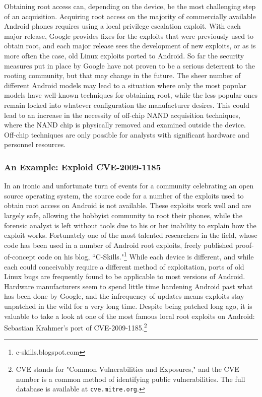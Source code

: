 Obtaining root access can, depending on the device, be the most challenging step of an acquisition.  Acquiring
root access on the majority of commercially available Android phones requires using a local privilege escalation exploit.  With each
major release, Google provides fixes for the exploits that were previously used to obtain root, and each major release sees the
development of new exploits, or as is more often the case, old Linux exploits ported to Android.  So far the security measures put
in place by Google have not proven to be a serious deterrent to the rooting community, but that may change in the future.  The sheer
number of different Android models may lead to a situation where only the most popular models have well-known techniques for
obtaining root, while the less popular ones remain locked into whatever configuration the manufacturer desires.  This could lead to
an increase in the necessity of off-chip NAND acquisition techniques, where the NAND chip is physically removed and examined outside
the device. Off-chip techniques are only possible for analysts with significant hardware and personnel resources.

\subsubsection{An Example: Exploid CVE-2009-1185}
In an ironic and unfortunate turn of events for
a community celebrating an open source operating system, the source code for a number of the exploits used to obtain root access on
Android is not available.  These exploits work well and are largely safe, allowing the hobbyist community to root their phones,
while the forensic analyst is left without tools due to his or her inability to explain how the exploit works.  Fortunately one of
the most talented researchers in the field, whose code has been used in a number of Android root exploits, freely
published proof-of-concept code on his blog,
``C-Skills."\footnote{c-skills.blogspot.com}  While each device is different, and while each could conceivably require a different
method of exploitation, ports of old Linux bugs are frequently found to be applicable to most versions of Android.  Hardware
manufacturers seem to spend little time hardening Android past what has been done by Google, and the infrequency of updates means
exploits stay unpatched in the wild for a very long time. Despite being patched long ago, it is valuable to take a
look at one of the most famous local root exploits on Android: Sebastian Krahmer's port of CVE-2009-1185.\footnote{CVE stands for
"Common Vulnerabilities and Exposures," and the CVE number is a common method of identifying public vulnerabilities. The full 
database is available at \texttt{cve.mitre.org}. }
 
